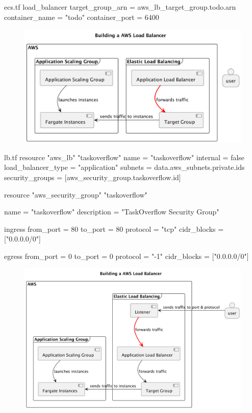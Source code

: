 \documentclass{csse4400}
\begin{document}

\begin{code}[language=terraform,numbers=none]{ecs.tf}
  load_balancer {
    target_group_arn = aws_lb_target_group.todo.arn
    container_name   = "todo"
    container_port   = 6400
  }
\end{code}


\begin{figure}[H]
  \includegraphics[width=\textwidth]{diagrams/lb3fargate}
\end{figure}

\begin{code}[language=terraform,numbers=none]{lb.tf}
resource "aws_lb" "taskoverflow" {
  name               = "taskoverflow"
  internal           = false
  load_balancer_type = "application"
  subnets            = data.aws_subnets.private.ids
  security_groups    = [aws_security_group.taskoverflow.id]
}

resource "aws_security_group" "taskoverflow" {
  name = "taskoverflow"
  description = "TaskOverflow Security Group"

  ingress {
    from_port = 80
    to_port = 80
    protocol = "tcp"
    cidr_blocks = ["0.0.0.0/0"]
  }

  egress {
    from_port = 0
    to_port = 0
    protocol = "-1"
    cidr_blocks = ["0.0.0.0/0"]
  }
}
\end{code}


\begin{figure}[H]
  \includegraphics[width=\textwidth]{diagrams/lb4fargate}
\end{figure}
\end{document}
